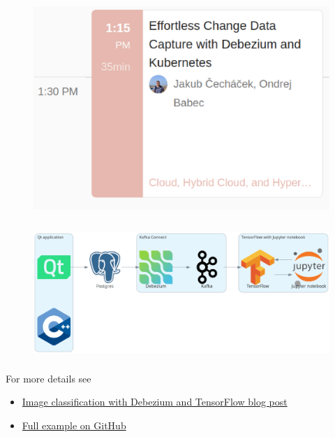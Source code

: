 \documentclass[10pt,utf8]{beamer}
\begin{document}
\begin{frame}
    \begin{figure}
        \centering
        \includegraphics[height=8cm]{./img/dbz_k8s_talk.eps}
    \end{figure}
\end{frame}

\begin{frame}
    \vspace*{-1cm}
    \begin{figure}
        \includegraphics[height=5cm]{./img/qt_to_tf.eps}
    \end{figure}
    
    For more details see
    \begin{itemize}
        \color{blue}
        \item \href{https://debezium.io/blog/2023/05/02/tensorflow-mnist-classification}{Image classification with Debezium and TensorFlow blog post}
        \item \href{https://github.com/debezium/debezium-examples/tree/main/machine-learning/tensorflow-mnist}{Full example on GitHub}
        \color{black}
    \end{itemize}
\end{frame}
\end{document}
